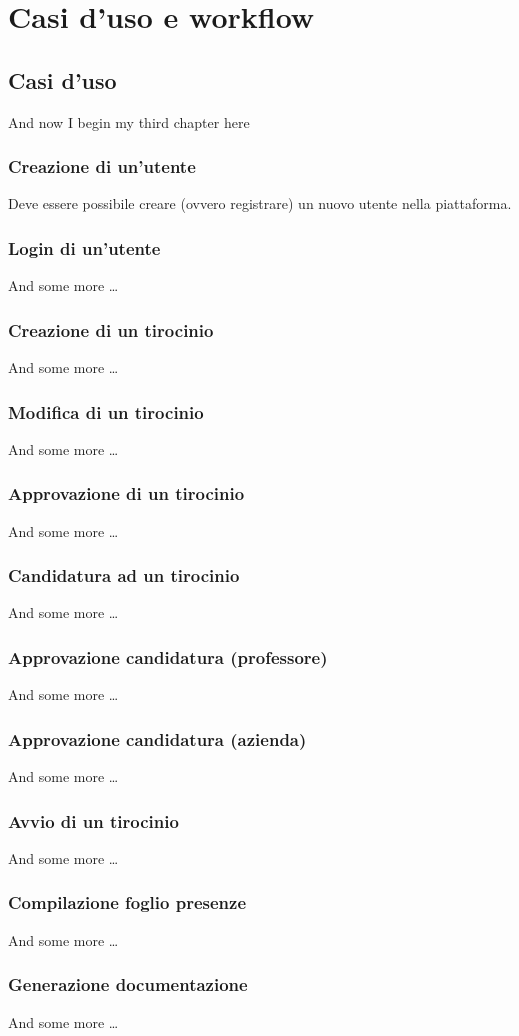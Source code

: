 \chapter{Casi d'uso e workflow}

\section{Casi d'uso}
And now I begin my third chapter here 

\subsection{Creazione di un'utente}

Deve essere possibile creare (ovvero registrare) un nuovo utente nella piattaforma. 

\subsection{Login di un'utente}
And some more \dots

\subsection{Creazione di un tirocinio}
And some more \dots

\subsection{Modifica di un tirocinio}
And some more \dots

\subsection{Approvazione di un tirocinio}
And some more \dots

\subsection{Candidatura ad un tirocinio}
And some more \dots

\subsection{Approvazione candidatura (professore)}
And some more \dots

\subsection{Approvazione candidatura (azienda)}
And some more \dots

\subsection{Avvio di un tirocinio}
And some more \dots

\subsection{Compilazione foglio presenze}
And some more \dots

\subsection{Generazione documentazione}
And some more \dots